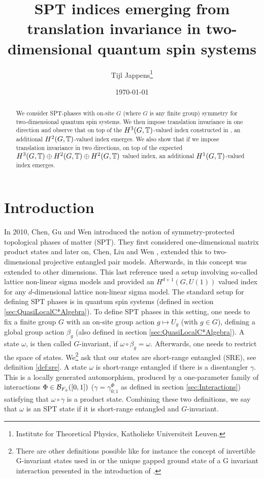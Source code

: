 \documentclass[11pt,a4paper,twoside]{article}
\title{SPT indices emerging from translation invariance in two-dimensional quantum spin systems}
\author{Tijl Jappens\footnote{Institute for Theoretical Physics, Katholieke Universiteit Leuven.}}
\date{\today}
\numberwithin{equation}{section}
\begin{document}
	\maketitle 
	\begin{abstract}
		We consider SPT-phases with on-site $G$ (where $G$ is any finite group) symmetry for two-dimensional quantum spin systems. We then impose translation invariance in one direction and observe that on top of the $H^3(G,\mathbb T)$-valued index constructed in \cite{ogata2021h3gmathbb}, an additional $H^2(G,\mathbb T)$-valued index emerges. We also show that if we impose translation invariance in two directions, on top of the expected $H^3(G,\mathbb T)\oplus H^2(G,\mathbb T)\oplus H^2(G,\mathbb T)$ valued index, an additional $H^1(G,\mathbb T)$-valued index emerges.
	\end{abstract}
	\section{Introduction}
	In 2010, Chen, Gu and Wen \cite{chen_gu_wen_2011} introduced the notion of symmetry-protected topological phases of matter (SPT). They first considered one-dimensional matrix product states and later on, Chen, Liu and Wen \cite{Chen_2011}, extended this to two-dimensional projective entangled pair models. Afterwards, in \cite{Chen_2013} this concept was extended to other dimensions. This last reference used a setup involving so-called lattice non-linear sigma models and provided an $H^{d+1}(G,U(1))$ valued index for any $d$-dimensional lattice non-linear sigma model. The standard setup for defining SPT phases is in quantum spin systems (defined in section \ref{sec:QuasiLocalC*Algebra}). To define SPT phases in this setting, one needs to fix a finite group $G$ with an on-site group action $g\mapsto U_g$ (with $g\in G$), defining a global group action $\beta_g$ (also defined in section \ref{sec:QuasiLocalC*Algebra}). A state $\omega$, is then called $G$-invariant, if $\omega\circ\beta_g=\omega$. Afterwards, one needs to restrict the space of states. We\footnote{There are other definitions possible like for instance the concept of invertible G-invariant states used in \cite{kapustin2021classification} or the unique gapped ground state of a G invariant interaction presented in the introduction of \cite{ogata2021h3gmathbb}.} ask that our states are short-range entangled (SRE), see definition \ref{def:sre}. A state $\omega$ is short-range entangled if there is a disentangler $\gamma$. This is a locally generated automorphism, produced by a one-parameter family of interactions $\Phi\in\mathcal B_{F_\phi}([0,1])$ ($\gamma=\gamma_{0;1}^\Phi$ as defined in section \ref{sec:Interactions}) satisfying that $\omega\circ\gamma$ is a product state. Combining these two definitions, we say that $\omega$ is an SPT state if it is short-range entangled and $G$-invariant.
\end{document}
